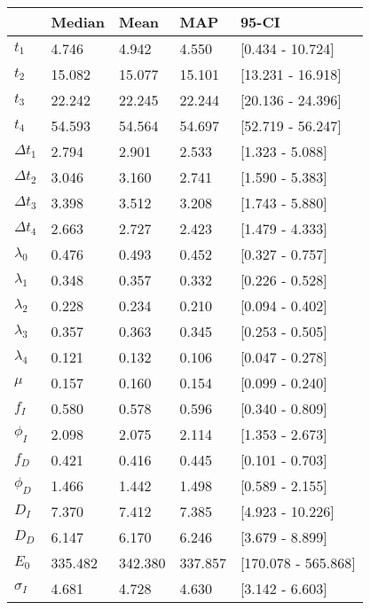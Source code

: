 \begin{tabular}{lllll}
\toprule
{} &   Median &     Mean &      MAP &                95-CI \\
\midrule
$t_1$        &    4.746 &    4.942 &    4.550 &     [0.434 - 10.724] \\
$t_2$        &   15.082 &   15.077 &   15.101 &    [13.231 - 16.918] \\
$t_3$        &   22.242 &   22.245 &   22.244 &    [20.136 - 24.396] \\
$t_4$        &   54.593 &   54.564 &   54.697 &    [52.719 - 56.247] \\
$\Delta t_1$ &    2.794 &    2.901 &    2.533 &      [1.323 - 5.088] \\
$\Delta t_2$ &    3.046 &    3.160 &    2.741 &      [1.590 - 5.383] \\
$\Delta t_3$ &    3.398 &    3.512 &    3.208 &      [1.743 - 5.880] \\
$\Delta t_4$ &    2.663 &    2.727 &    2.423 &      [1.479 - 4.333] \\
$\lambda_0$  &    0.476 &    0.493 &    0.452 &      [0.327 - 0.757] \\
$\lambda_1$  &    0.348 &    0.357 &    0.332 &      [0.226 - 0.528] \\
$\lambda_2$  &    0.228 &    0.234 &    0.210 &      [0.094 - 0.402] \\
$\lambda_3$  &    0.357 &    0.363 &    0.345 &      [0.253 - 0.505] \\
$\lambda_4$  &    0.121 &    0.132 &    0.106 &      [0.047 - 0.278] \\
$\mu$        &    0.157 &    0.160 &    0.154 &      [0.099 - 0.240] \\
$f_I$        &    0.580 &    0.578 &    0.596 &      [0.340 - 0.809] \\
$\phi_I$     &    2.098 &    2.075 &    2.114 &      [1.353 - 2.673] \\
$f_D$        &    0.421 &    0.416 &    0.445 &      [0.101 - 0.703] \\
$\phi_D$     &    1.466 &    1.442 &    1.498 &      [0.589 - 2.155] \\
$D_I$        &    7.370 &    7.412 &    7.385 &     [4.923 - 10.226] \\
$D_D$        &    6.147 &    6.170 &    6.246 &      [3.679 - 8.899] \\
$E_0$        &  335.482 &  342.380 &  337.857 &  [170.078 - 565.868] \\
$\sigma_I$   &    4.681 &    4.728 &    4.630 &      [3.142 - 6.603] \\

\end{tabular}

